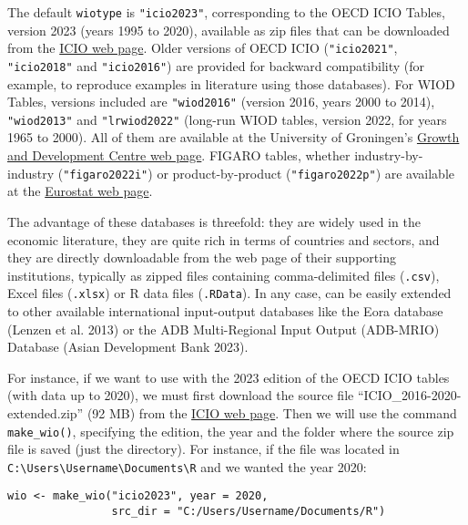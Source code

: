 The default \texttt{wiotype} is \texttt{"icio2023"}, corresponding to the OECD ICIO Tables,
version 2023 (years 1995 to 2020), available as zip files that can be downloaded
from the \href{https://www.oecd.org/sti/ind/inter-country-input-output-tables.htm}{ICIO web
page}. Older
versions of OECD ICIO (\texttt{"icio2021"}, \texttt{"icio2018"} and \texttt{"icio2016"}) are provided
for backward compatibility (for example, to reproduce examples in literature
using those databases). For WIOD Tables, versions included are \texttt{"wiod2016"}
(version 2016, years 2000 to 2014), \texttt{"wiod2013"} and \texttt{"lrwiod2022"} (long-run
WIOD tables, version 2022, for years 1965 to 2000). All of them are available at
the University of Groningen's \href{https://www.rug.nl/ggdc/valuechain/wiod/}{Growth and Development Centre web
page}. FIGARO tables, whether
industry-by-industry (\texttt{"figaro2022i"}) or product-by-product (\texttt{"figaro2022p"})
are available at the \href{https://ec.europa.eu/eurostat/web/esa-supply-use-input-tables/database}{Eurostat web
page}.

The advantage of these databases is threefold: they are widely used in the
economic literature, they are quite rich in terms of countries and sectors, and
they are directly downloadable from the web page of their supporting
institutions, typically as zipped files containing comma-delimited files
(\texttt{.csv}), Excel files (\texttt{.xlsx}) or R data files (\texttt{.RData}). In any case,
 can be easily extended to other available international
input-output databases like the Eora database (Lenzen et al. 2013) or the ADB
Multi-Regional Input Output (ADB-MRIO) Database
(Asian Development Bank 2023).

For instance, if we want to use  with the 2023 edition of the
OECD ICIO tables (with data up to 2020), we must first download the source file
``ICIO\_2016-2020-extended.zip'' (92 MB) from the \href{https://www.oecd.org/sti/ind/inter-country-input-output-tables.htm}{ICIO web
page}. Then
we will use the command \texttt{make\_wio()}, specifying the edition, the year and the
folder where the source zip file is saved (just the directory). For instance, if
the file was located in \texttt{C:\textbackslash{}Users\textbackslash{}Username\textbackslash{}Documents\textbackslash{}R} and we wanted the year
2020:

\begin{verbatim}
wio <- make_wio("icio2023", year = 2020, 
                src_dir = "C:/Users/Username/Documents/R")
\end{verbatim}

